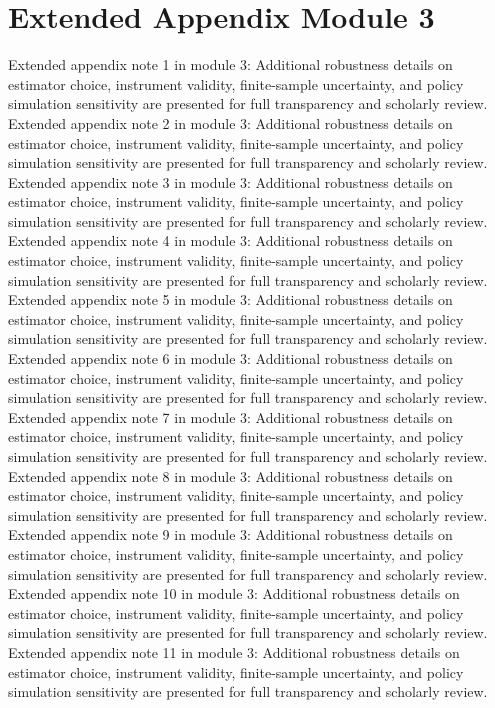 \documentclass[preprint,12pt]{elsarticle}
\begin{document}
\section{Extended Appendix Module 3}
Extended appendix note 1 in module 3: Additional robustness details on estimator choice, instrument validity, finite-sample uncertainty, and policy simulation sensitivity are presented for full transparency and scholarly review.
Extended appendix note 2 in module 3: Additional robustness details on estimator choice, instrument validity, finite-sample uncertainty, and policy simulation sensitivity are presented for full transparency and scholarly review.
Extended appendix note 3 in module 3: Additional robustness details on estimator choice, instrument validity, finite-sample uncertainty, and policy simulation sensitivity are presented for full transparency and scholarly review.
Extended appendix note 4 in module 3: Additional robustness details on estimator choice, instrument validity, finite-sample uncertainty, and policy simulation sensitivity are presented for full transparency and scholarly review.
Extended appendix note 5 in module 3: Additional robustness details on estimator choice, instrument validity, finite-sample uncertainty, and policy simulation sensitivity are presented for full transparency and scholarly review.
Extended appendix note 6 in module 3: Additional robustness details on estimator choice, instrument validity, finite-sample uncertainty, and policy simulation sensitivity are presented for full transparency and scholarly review.
Extended appendix note 7 in module 3: Additional robustness details on estimator choice, instrument validity, finite-sample uncertainty, and policy simulation sensitivity are presented for full transparency and scholarly review.
Extended appendix note 8 in module 3: Additional robustness details on estimator choice, instrument validity, finite-sample uncertainty, and policy simulation sensitivity are presented for full transparency and scholarly review.
Extended appendix note 9 in module 3: Additional robustness details on estimator choice, instrument validity, finite-sample uncertainty, and policy simulation sensitivity are presented for full transparency and scholarly review.
Extended appendix note 10 in module 3: Additional robustness details on estimator choice, instrument validity, finite-sample uncertainty, and policy simulation sensitivity are presented for full transparency and scholarly review.
Extended appendix note 11 in module 3: Additional robustness details on estimator choice, instrument validity, finite-sample uncertainty, and policy simulation sensitivity are presented for full transparency and scholarly review.
\end{document}
